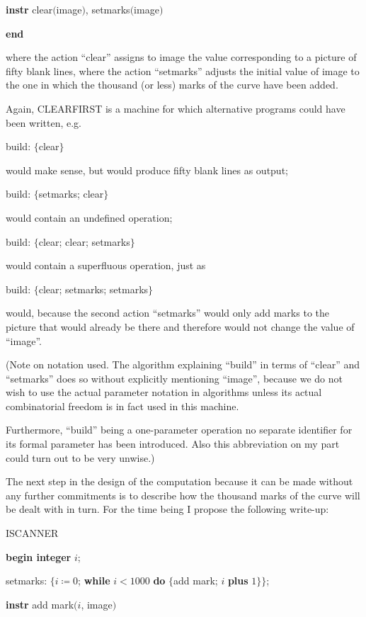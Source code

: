 \quad \textbf{instr} clear$($image$)$, setmarks$($image$)$

\textbf{end}

\noindent
where the action ``clear'' assigns to image the value corresponding to a picture of fifty blank lines, where the action ``setmarks'' adjusts the initial value of image to the one in which the thousand (or less) marks of the curve have been added.

Again, CLEARFIRST is a machine for which alternative programs could have been written, e.g.

build: $\{$clear$\}$

\noindent
would make sense, but would produce fifty blank lines as output;

build: $\{$setmarks; clear$\}$

\noindent
would contain an undefined operation;

build: $\{$clear; clear; setmarks$\}$

\noindent
would contain a superfluous operation, just as

build: $\{$clear; setmarks; setmarks$\}$

\noindent
would, because the second action ``setmarks'' would only add marks to the picture that would already be there and therefore would not change the value of ``image''.

(Note on notation used. The algorithm explaining ``build'' in terms of ``clear'' and ``setmarks'' does so without explicitly mentioning ``image'', because we do not wish to use the actual parameter notation in algorithms unless its actual combinatorial freedom is in fact used in this machine.

Furthermore, ``build'' being a one-parameter operation no separate identifier for its formal parameter has been introduced. Also this abbreviation on my part could turn out to be very unwise.)

The next step in the design of the computation \textemdash{}  because it can be made without any further commitments \textemdash{}  is to describe how the thousand marks of the curve will be dealt with in turn. For the time being I propose the following write-up:

ISCANNER

\textbf{begin integer} $i$;

\quad setmarks: $\{i \coloneq 0$; \textbf{while} $i < 1000$ \textbf{do} $\{$add mark; $i$ \textbf{plus} $1\}\}$;

\quad \textbf{instr} add mark$(i$, image$)$

